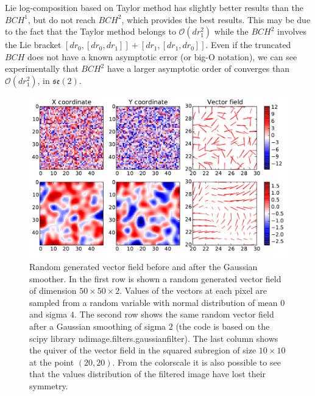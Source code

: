Lie log-composition based on Taylor method has slightly better results than the $BCH^1$, but do not reach $BCH^2$, which provides the best results. This may be due to the fact that the Taylor method belongs to $\mathcal{O}(dr_1^2)$ while the $BCH^2$ involves the Lie bracket $[dr_0,[dr_0, dr_1]] + [dr_1,[dr_1, dr_0]]$. Even if the truncated $BCH$ does not have a known asymptotic error (or big-O notation), we can see experimentally that $BCH^2$ have a larger asymptotic order of converges than $\mathcal{O}(dr_1^2)$, in $\mathfrak{se}(2)$.
%
\begin{figure}[!ht]
	\includegraphics[scale=0.70]{figures/svf_gaussian_smoothing_effects.pdf}
	\caption{Random generated vector field before and after the Gaussian smoother. In the first row is shown a random generated vector field of dimension $50\times 50 \times 2$. Values of the vectors at each pixel are sampled from a random variable with normal distribution of mean $0$ and sigma $4$. The second row shows the same random vector field after a Gaussian smoothing of sigma $2$ (the code is based on the scipy library ndimage.filters.gaussian\textunderscore filter). The last column shows the quiver of the vector field in the squared subregion of size $10\times 10$ at the point $(20,20)$. From the colorscale it is also possible to see that the values distribution of the filtered image have lost their symmetry. }
	\label{fig:SVF_gaussian_smoothing_effects}
\end{figure}

